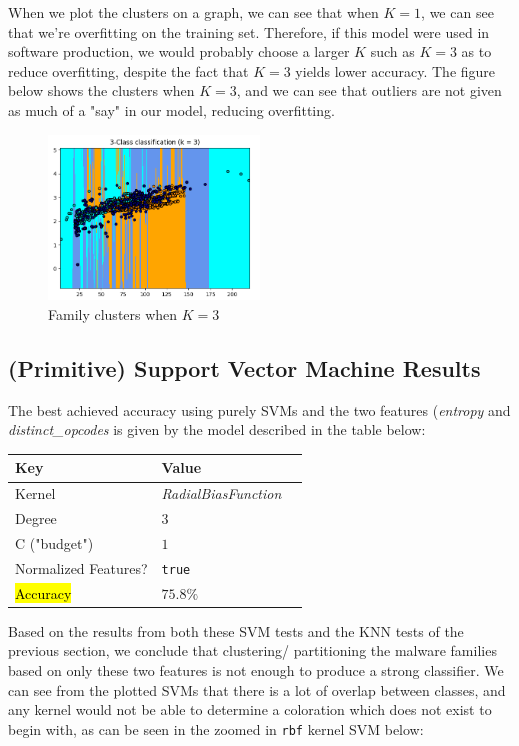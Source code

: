 \documentclass[12pt]{article}
\begin{document}
          When we plot the clusters on a graph, we can see that when $K = 1$, we can see that we're overfitting on the training set. Therefore, if this model were used in software production, we would probably choose a larger $K$ such as $K=3$ as to reduce overfitting, despite the fact that $K=3$ yields lower accuracy. The figure below shows the clusters when $K=3$, and we can see that outliers are not given as much of a "say" in our model, reducing overfitting.
          \begin{figure}[H]
          \centering
          \includegraphics[width=0.5\textwidth]{k3.png}
          \caption{Family clusters when $K=3$}
          \end{figure}
  
\subsection{(Primitive) Support Vector Machine Results}
  The best achieved accuracy using purely SVMs and the two features (\textit{entropy} and \textit{distinct\_opcodes} is given by the model described in the table below:
  \begin{table}[H]
    \centering
  \begin{tabular}{|l|l|l|}
    \hline \textbf{Key} & \textbf{Value} \\\hline \hline
    Kernel                   &        \textit{RadialBiasFunction}\\\hline
  Degree            &        $ 3                   $\\\hline       
  C ("budget")      &        $ 1                  $\\\hline 
  Normalized Features?  &   \texttt{true}  \\\hline 
  \hl{Accuracy} &   $ 75.8\%$\\\hline 
  \end{tabular}
  \end{table}  
 
  Based on the results from both these SVM tests and the KNN tests of the previous section, we conclude that clustering/ partitioning the malware families based on only these two features is not enough to produce a strong classifier. We can see from the plotted SVMs that there is a lot of overlap between classes, and any kernel would not be able to determine a coloration which does not exist to begin with, as can be seen in the zoomed in \texttt{rbf} kernel SVM below:
\end{document}
